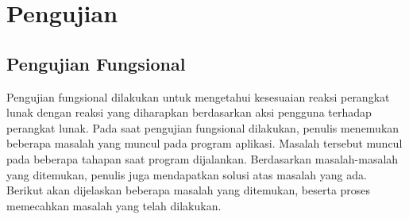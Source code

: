 \section{Pengujian}

\subsection{Pengujian Fungsional}
Pengujian fungsional dilakukan untuk mengetahui kesesuaian reaksi perangkat lunak dengan reaksi yang diharapkan berdasarkan aksi pengguna terhadap perangkat lunak. Pada saat pengujian fungsional dilakukan, penulis menemukan beberapa masalah yang muncul pada program aplikasi. Masalah tersebut muncul pada beberapa tahapan saat program dijalankan. Berdasarkan masalah-masalah yang ditemukan, penulis juga mendapatkan solusi atas masalah yang ada. Berikut akan dijelaskan beberapa masalah yang ditemukan, beserta proses memecahkan masalah yang telah dilakukan.

